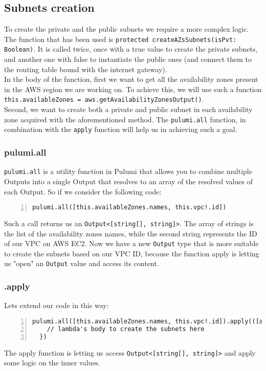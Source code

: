 \subsection{Subnets creation}
To create the private and the public subnets we require a more complex logic.
The function that has been used is \texttt{protected createAZsSubnets(isPvt: Boolean)}.
It is called twice, once with a true value to create the private subnets, and another one with false to instantiate the public ones (and connect them to the routing table bound with the internet gateway).\\
In the body of the function, first we want to get all the availability zones present in the AWS region we are working on.
To achieve this, we will use such a function \texttt{this.availableZones = aws.getAvailabilityZonesOutput()}.\\
Second, we want to create both a private and public subnet in each availability zone acquired with the aforementioned method.
The \texttt{pulumi.all} function, in combination with the \texttt{apply} function will help us in achieving such a goal.\\

\subsubsection{pulumi.all}
\label{sssec:pulumi-all}
\texttt{pulumi.all} is a utility function in Pulumi that allows you to combine multiple Outputs into a single Output that resolves to an array of the resolved values of each Output.
So if we consider the following code:\\
\begin{minipage}{\linewidth}
\begin{lstlisting}[numbers=left, numberstyle=\tiny, numbersep=-5pt, stepnumber=1]
  pulumi.all([this.availableZones.names, this.vpc!.id])
\end{lstlisting}
\end{minipage}
Such a call returns us an \texttt{Output<[string[], string]>}.
The array of strings is the list of the availability zones names, while the second string represents the ID of our VPC on AWS EC2.
Now we have a new \texttt{Output} type that is more suitable to create the subnets based on our VPC ID, because the function apply is letting us "open" an \texttt{Output} value and access its content.

\subsubsection{.apply}
Lets extend our code in this way:\\
\begin{minipage}{\linewidth}
\begin{lstlisting}[numbers=left, numberstyle=\tiny, numbersep=-5pt, stepnumber=1]
  pulumi.all([this.availableZones.names, this.vpc!.id]).apply(([azNames, vpcId]) => {
    // lambda's body to create the subnets here
  })
\end{lstlisting}
\end{minipage}
The apply function is letting us access \texttt{Output<[string[], string]>} and apply some logic on the inner values.\\

